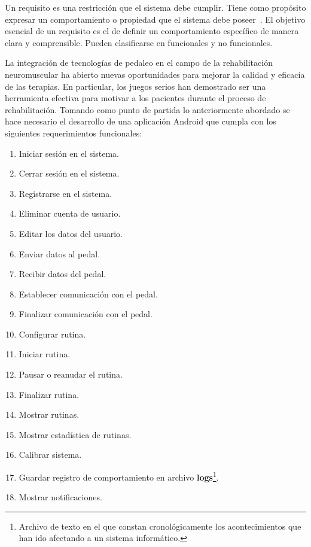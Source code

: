 \newpage
{}
Un requisito es una restricción que el sistema debe cumplir. Tiene como propósito expresar un comportamiento o propiedad que el sistema debe poseer~\cite{jacobson2000uml}. El objetivo esencial de un requisito es el de definir un comportamiento específico de manera clara y comprensible. Pueden clasificarse en funcionales y no funcionales.

La integración de tecnologías de pedaleo en el campo de la rehabilitación neuromuscular ha abierto nuevas oportunidades para mejorar la calidad y eficacia de las terapias. En particular, los juegos serios han demostrado ser una herramienta efectiva para motivar a los pacientes durante el proceso de rehabilitación. Tomando como punto de partida lo anteriormente abordado se hace necesario el desarrollo de una aplicación Android que cumpla con los siguientes requerimientos funcionales:    

\begin{enumerate}
    \item Iniciar sesión en el sistema.
    \item Cerrar sesión en el sistema.
    \item Registrarse en el sistema.
    \item Eliminar cuenta de usuario.
    \item Editar los datos del usuario.
    \item Enviar datos al pedal.
    \item Recibir datos del pedal.
    \item Establecer comunicación con el pedal.
    \item Finalizar comunicación con el pedal.
    \item Configurar rutina.
    \item Iniciar rutina.
    \item Pausar o reanudar el rutina.
    \item Finalizar rutina.
    \item Mostrar rutinas.
    \item Mostrar estadística de rutinas.
    \item Calibrar sistema.
    \item Guardar registro de comportamiento en archivo \textbf{logs}\footnote{Archivo de texto en el que constan cronológicamente los acontecimientos que han ido afectando a un sistema informático.}.
    \item Mostrar notificaciones.
\end{enumerate}



